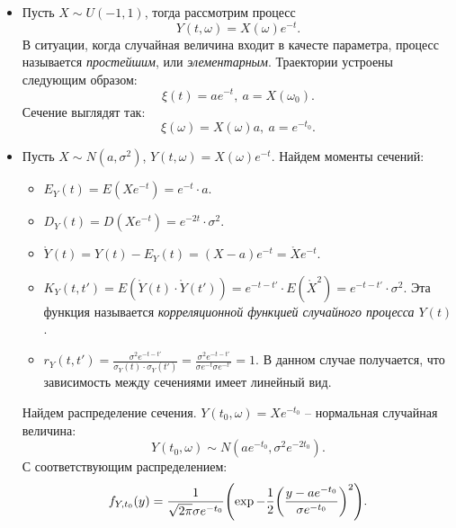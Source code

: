 \begin{example}
    \enewline
    \begin{itemize}
        \item Пусть $X \sim U(-1, 1)$, тогда рассмотрим процесс
            \[
                Y(t, \omega) = X(\omega) e^{-t}
            .\]
            В ситуации, когда случайная величина входит в качесте параметра,
            процесс называется \textit{простейшим}, или \textit{элементарным}.
            Траектории устроены следующим образом:
            \[
                \xi(t) = a e^{-t},~ a = X(\omega_0)
            .\]
            Сечение выглядят так:
            \[
                \xi(\omega) = X(\omega) a,~ a = e^{-t_0} 
            .\]
        \item Пусть $X \sim N(a, \sigma^2)$, $Y(t, \omega) = X(\omega) e^{-t}$.
            Найдем моменты сечений:
            \begin{itemize}
                \item $E_Y(t) = E(X e^{-t}) = e^{-t} \cdot a$.
                \item $D_Y(t) = D(X e^{-t}) = e^{-2t} \cdot \sigma^2$.
                \item $\mathring{Y}(t) = Y(t) - E_Y(t) = (X - a) e^{-t} = 
                    \mathring{X} e^{-t}$.
                \item $K_Y(t, t') = E(\mathring{Y}(t) \cdot \mathring{Y}(t'))
                    = e^{-t - t'} \cdot E(\mathring{X}^2) = e^{-t -t'} 
                    \cdot \sigma^2$. Эта функция называется
                    \textit{корреляционной функцией случайного процесса $Y(t)$}.
                \item $r_Y(t, t') = \frac{\sigma^2 e^{-t-t'}}{\sigma_Y(t) \cdot 
                        \sigma_Y(t')} = \frac{\sigma^2 e^{-t-t'}}{\sigma e^{-t} 
                    \sigma e^{-t'}} = 1$. В данном случае получается, что
                    зависимость между сечениями имеет линейный вид.
            \end{itemize}
            Найдем распределение сечения. $Y(t_0, \omega) = X e^{-t_0}$ -- 
            нормальная случайная величина:
            \[
                Y(t_0, \omega) \sim N(a e^{-t_0}, \sigma^2 e^{-2 t_0})
            .\]
            С соответствующим распределением:
            \[
                f_{Y, t_0}(y) = \frac{1}{\sqrt{2 \pi} \sigma e^{-t_0}} 
                \parens*{\exp{-\frac{1}{2} \parens*{\frac{y - a e^{-t_0}}
                {\sigma e^{-t_0}}}^2}}
            .\]
    \end{itemize}
\end{example}

